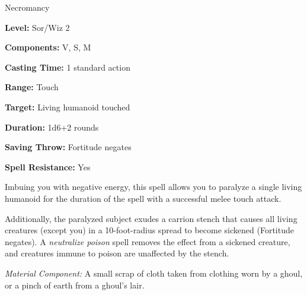 
Necromancy

\textbf{Level:} Sor/Wiz 2

\textbf{Components:} V, S, M

\textbf{Casting Time:} 1 standard action

\textbf{Range:} Touch

\textbf{Target:} Living humanoid touched

\textbf{Duration:} 1d6+2 rounds

\textbf{Saving Throw:} Fortitude negates

\textbf{Spell Resistance:} Yes

Imbuing you with negative energy, this spell allows you to paralyze a single living 
humanoid for the duration of the spell with a successful melee touch attack.

Additionally, the paralyzed subject exudes a carrion stench that causes all living 
creatures (except you) in a 10-foot-radius spread to become sickened (Fortitude 
negates). A \textit{neutralize poison} spell removes the effect from a sickened 
creature, and creatures immune to poison are unaffected by the stench.

\textit{Material Component:} A small scrap of cloth taken from clothing worn by 
a ghoul, or a pinch of earth from a ghoul's lair.

